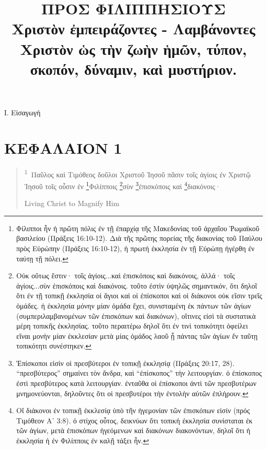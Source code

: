 \documentclass{article}
\newcommand{\currentverse}{1} %
\newcommand{\setcurrentverse}[1]{\renewcommand{\currentverse}{#1}}
\newcounter{versecounter}
\newcommand{\newverse}{%
  \stepcounter{versecounter}%
  \setcounter{footnote}{0}%
}
\renewcommand{\thefootnote}{\textsuperscript{\theversecounter\textsuperscript{\arabic{footnote}}}}
\begin{document}

\newcommand{\versenum}[1]{%
  \newverse%
  \textbf{\textcolor{verseblue}{#1}}
}

\renewcommand{\thefootnote}{\textcolor{footnoteblue}{\arabic{footnote}}}

\title{ΠΡΟΣ ΦΙΛΙΠΠΗΣΙΟΥΣ\\[1ex] \Large Χριστὸν ἐμπειράζοντες - Λαμβάνοντες Χριστὸν ὡς τὴν ζωὴν ἡμῶν, τύπον, σκοπόν, δύναμιν, καὶ μυστήριον.}
\date{}
\maketitle
Ι. Εἰσαγωγή

\section*{ΚΕΦΑΛΑΙΟΝ 1}

\begin{verse}

\setcurrentverse{1}

\setcounter{footnote}{0}

\textsuperscript{1}~Παῦλος καὶ Τιμόθεος δοῦλοι Χριστοῦ Ἰησοῦ πᾶσιν τοῖς ἁγίοις ἐν Χριστῷ Ἰησοῦ τοῖς οὖσιν ἐν \footnote{
Φίλιπποι ἦν ἡ πρῶτη πόλις ἐν τῇ ἐπαρχίᾳ τῆς Μακεδονίας τοῦ 
ἀρχαῖου Ῥωμαϊκοῦ βασιλείου (Πράξεις 16:10-12). Διὰ τῆς πρῶτης πορείας τῆς διακονίας τοῦ Παύλου πρὸς Εὐρώπην (Πράξεις 16:10-12), ἡ πρωτή ἐκκλησία ἐν τῇ Εὐρώπῃ ἠγέρθη ἐν ταύτῃ τῇ πόλει.
    }Φιλίπποις \footnote{
    Οὐκ οὔτως ἔστιν· τοῖς ἁγίοις...καὶ ἐπισκόποις καὶ διακόνοις, ἀλλά· τοῖς ἁγίοις...σὺν ἐπισκόποις καὶ διακόνοις. τοῦτο ἐστὶν ὑψηλῶς σημαντικόν, ὅτι δηλοῖ ὅτι ἐν τῇ τοπικῇ ἐκκλησία οἱ ἅγιοι καὶ οἱ ἐπίσκοποι καὶ οἱ διάκονοι οὐκ εἴσιν τρεῖς ὁμάδες. ἡ ἐκκλησία μόνην μίαν ὁμάδα ἔχει, συνισταμένη ἐκ πάντων τῶν ἁγίων (συμπεριλαμβανομένων τῶν ἐπισκόπων καὶ διακόνων), οἵτινες εἰσὶ τὰ συστατικὰ μέρη τοπικῆς ἐκκλησίας. τοῦτο περαιτέρω δηλοῖ ὅτι ἐν τινὶ τοπικότητι ὀφείλει εἴναι μονὴν μίαν ἐκκλεσίαν μετὰ μίας ὁμάδος λαοῦ ᾗ πάντας τῶν ἁγίων ἔν ταῦτῃ τοπικότητι συνέστηκεν.
    }σὺν \footnote{
Ἐπίσκοποι εἰσὶν οἱ πρεσβύτεροι ἐν τοπικῇ ἐκκλησίᾳ (Πράξεις 20:17, 28). “πρεσβύτερος” σημαίνει τὸν ἄνδρα, καὶ “ἐπίσκοπος” τὴν λειτουργίαν. ὁ ἐπίσκοπος ἐστὶ πρεσβύτερος κατὰ λειτουργίαν. ἐνταῦθα οἱ ἐπίσκοποι ἀντὶ τῶν πρεσβυτέρων μνημονεύονται, δηλοῦντες ὅτι οἱ πρεσβυτέροι τὴν ἐντολὴν αὐτῶν ἐπλήρουν.
    }ἐπισκόποις καὶ \footnote{
    Οἵ διάκονοι ἐν τοπικῇ ἐκκλεσίᾳ ὑπὸ τῆν ἡγεμονίαν τῶν ἐπισκόπων εἰσίν (πρός Τιμόθεον Aʹ 3:8). ὁ στίχος οὗτος, δεικνύων ὄτι τοπική ἐκκλησία συνίσταται ἐκ τῶν ἁγίων, μετὰ ἐπισκόπων ἡγεόμενων καὶ διακόνων διακονόντων, δηλοῖ ὅτι ἡ ἐκκλησία ἡ ἐν Φιλίπποις ἐν καλῇ τάξει ἦν.
    }διακόνοις·

Living Christ to Magnify Him

\end{verse}
\end{document}
